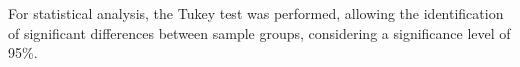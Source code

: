 For statistical analysis, the Tukey test was performed, allowing the identification of significant differences between sample groups, considering a significance level of 95\%.









